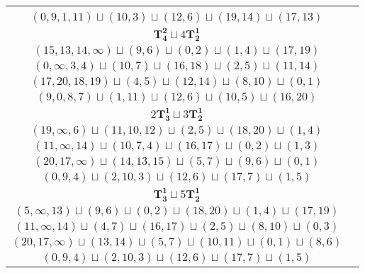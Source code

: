 \documentclass{article}
\begin{document}
\begin{longtable}{|c|c|}
\begin{tabular}{c}
        $(18,20,17,\infty)\sqcup(4,5)\sqcup(12,14)\sqcup(8,10)\sqcup(0,1)$ \\ 
        $(0,9,1,11)\sqcup(10,3)\sqcup(12,6)\sqcup(19,14)\sqcup(17,13)$
        \end{tabular} \\ 
        \hline
        $\mathbf{T_{4}^{2}} \sqcup 4\mathbf{T_{2}^{1}}$ & \begin{tabular}{c}
        $(8,\infty,9,5)\sqcup(12,15)\sqcup(16,17)\sqcup(1,2)\sqcup(3,4)$ \\ 
        $(15,13,14,\infty)\sqcup(9,6)\sqcup(0,2)\sqcup(1,4)\sqcup(17,19)$ \\ 
        $(0,\infty,3,4)\sqcup(10,7)\sqcup(16,18)\sqcup(2,5)\sqcup(11,14)$ \\ 
        $(17,20,18,19)\sqcup(4,5)\sqcup(12,14)\sqcup(8,10)\sqcup(0,1)$ \\ 
        $(9,0,8,7)\sqcup(1,11)\sqcup(12,6)\sqcup(10,5)\sqcup(16,20)$
        \end{tabular} \\ 
        \hline
        $2\mathbf{T_{3}^{1}} \sqcup 3\mathbf{T_{2}^{1}}$ & \begin{tabular}{c}
        $(8,\infty,9)\sqcup(13,12,15)\sqcup(4,5)\sqcup(16,18)\sqcup(1,2)$ \\ 
        $(19,\infty,6)\sqcup(11,10,12)\sqcup(2,5)\sqcup(18,20)\sqcup(1,4)$ \\ 
        $(11,\infty,14)\sqcup(10,7,4)\sqcup(16,17)\sqcup(0,2)\sqcup(1,3)$ \\ 
        $(20,17,\infty)\sqcup(14,13,15)\sqcup(5,7)\sqcup(9,6)\sqcup(0,1)$ \\ 
        $(0,9,4)\sqcup(2,10,3)\sqcup(12,6)\sqcup(17,7)\sqcup(1,5)$
        \end{tabular} \\ 
        \hline
        $\mathbf{T_{3}^{1}} \sqcup 5\mathbf{T_{2}^{1}}$ & \begin{tabular}{c}
        $(8,\infty,9)\sqcup(12,15)\sqcup(4,5)\sqcup(16,18)\sqcup(1,2)\sqcup(19,20)$ \\ 
        $(5,\infty,13)\sqcup(9,6)\sqcup(0,2)\sqcup(18,20)\sqcup(1,4)\sqcup(17,19)$ \\ 
        $(11,\infty,14)\sqcup(4,7)\sqcup(16,17)\sqcup(2,5)\sqcup(8,10)\sqcup(0,3)$ \\ 
        $(20,17,\infty)\sqcup(13,14)\sqcup(5,7)\sqcup(10,11)\sqcup(0,1)\sqcup(8,6)$ \\ 
        $(0,9,4)\sqcup(2,10,3)\sqcup(12,6)\sqcup(17,7)\sqcup(1,5)$
        \end{tabular} \\ 
        \hline
    \end{longtable}
    
    
\end{document}
